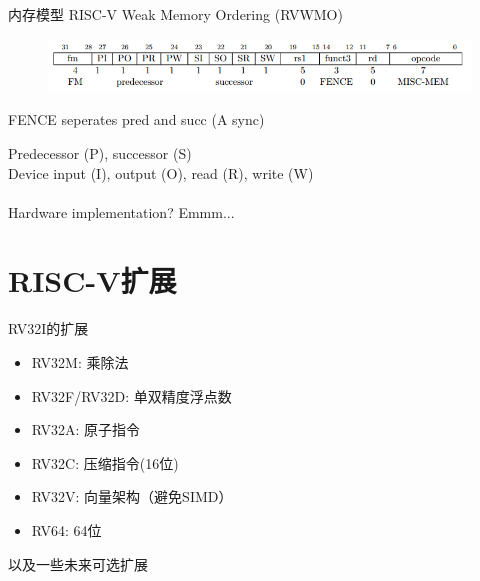 \documentclass{myslide}
\begin{document}
\begin{frame}{内存模型}
RISC-V Weak Memory Ordering (RVWMO)
\begin{figure}
\centering
\includegraphics[width=\linewidth]{fig/Lecture2/misc-mem.PNG}
\end{figure}
\begin{center}
FENCE seperates pred and succ (A sync)
\end{center}
Predecessor (P), successor (S)\\
Device input (I), output (O), read (R), write (W)\\
\quad\\
Hardware implementation? Emmm...
\end{frame}


\section{RISC-V扩展}
\begin{frame}
\sectionpage
\end{frame}

\begin{frame}{RV32I的扩展}
\begin{itemize}
	\item RV32M: 乘除法
	\item RV32F/RV32D: 单双精度浮点数
	\item RV32A: 原子指令
	\item RV32C: 压缩指令(16位)
	\item RV32V: 向量架构（避免SIMD）
	\item RV64: 64位
\end{itemize}
以及一些未来可选扩展
\end{frame}
\end{document}
